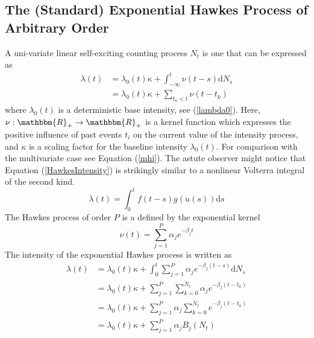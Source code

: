 \documentclass{amsart}
\newcommand{\mathd}{\mathrm{d}}
\begin{document}
\subsection{The (Standard) Exponential Hawkes Process of Arbitrary Order}

A uni-variate linear self-exciting counting process $N_t$ is one that can be
expressed as
\begin{equation}
  \begin{array}{ll}
    \lambda ( t) & = \lambda_0 ( t) \kappa + \int_{- \infty}^t \nu ( t - s)
    \mathd N_s\\
    & = \lambda_0 ( t) \kappa + \sum_{t_k < t} \nu ( t - t_k)
  \end{array} \label{HawkesIntensity}
\end{equation}
where $\lambda_0 ( t)$ is a deterministic base intensity, see (\ref{lambda0}).
{\cite{hawkes-finance}}{\cite{hawkes1971spectra}}{\cite{shek2010modeling}}{\cite{chavez2012high}}{\cite[11.3]{hautsch2011econometrics}}
Here, \ $\nu : \mathbbm{R}_+ \rightarrow \mathbbm{R}_+$ is a kernel function
which expresses the positive influence of past events $t_i$ on the current
value of the intensity process, and $\kappa$ is a scaling factor for the
baseline intensity $\lambda_0 ( t)$. For comparison with the multivariate case
see Equation (\ref{mhi}). The astute observer might notice that Equation
(\ref{HawkesIntensity}) is strikingly similar to a nonlinear Volterra integral
of the second kind. {\cite{nvs}}
\begin{equation}
  \lambda ( t) = \int_0^t f ( t - s) g ( u ( s)) \mathd s
\end{equation}
The Hawkes process of order $P$ is a defined by the exponential kernel
\begin{equation}
  \nu ( t) = \sum_{j = 1}^P \alpha_j e^{- \beta_j t} \label{exp}
\end{equation}
The intensity of the exponential Hawkes process is written as
\begin{equation}
  \begin{array}{ll}
    \lambda ( t) & = \lambda_0 ( t) \kappa + \int_0^t \sum_{j = 1}^P \alpha_j
    e^{- \beta_j ( t - s)} \mathd N_s\\
    & = \lambda_0 ( t) \kappa + \sum_{j = 1}^P \sum_{k = 0}^{\breve{N}_t}
    \alpha_j e^{- \beta_j ( t - t_k)}\\
    & = \lambda_0 ( t) \kappa + \sum_{j = 1}^P \alpha_j \sum_{k =
    0}^{\breve{N}_t} e^{- \beta_j ( t - t_k)}\\
    & = \lambda_0 ( t) \kappa + \sum_{j = 1}^P \alpha_j B_j ( N_t)
  \end{array}
\end{equation}
\end{document}
